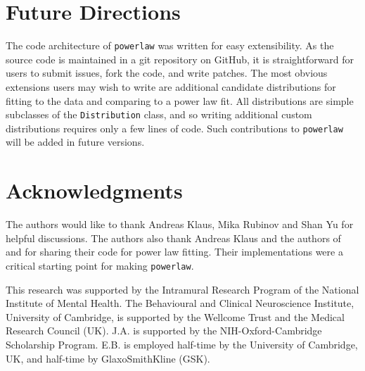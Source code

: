 \documentclass[10pt]{article}
\begin{document}
\section*{Future Directions}
The code architecture of \verb$powerlaw$ was written for easy extensibility. As the source code is maintained in a git repository on GitHub, it is straightforward for users to submit issues, fork the code, and write patches. The most obvious extensions users may wish to write are additional candidate distributions for fitting to the data and comparing to a power law fit. All distributions are simple subclasses of the \verb$Distribution$ class, and so writing additional custom distributions requires only a few lines of code. Such contributions to \verb$powerlaw$ will be added in future versions. 

\section*{Acknowledgments}
The authors would like to thank Andreas Klaus, Mika Rubinov and Shan Yu for helpful discussions. The authors also thank Andreas Klaus and the authors of \cite{Clauset2009} and \cite{Ginsburg2012} for sharing their code for power law fitting. Their implementations were a critical starting point for making \verb$powerlaw$.

This research was supported by the Intramural Research Program of the National Institute of Mental Health. The Behavioural and Clinical Neuroscience Institute, University of Cambridge, is supported by the Wellcome Trust and the Medical Research Council (UK). J.A. is supported by the NIH-Oxford-Cambridge Scholarship Program. E.B. is employed half-time by the University of Cambridge, UK, and half-time by GlaxoSmithKline (GSK).



\end{document}
